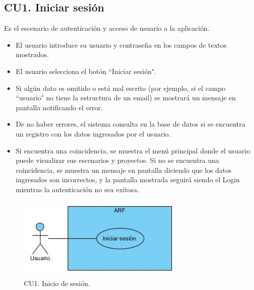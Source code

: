 \subsection{CU1. Iniciar sesión}\par
Es el escenario de autenticación y acceso de usuario a la aplicación. 
\begin{itemize}
	\item El usuario introduce su usuario y contraseña en los campos de textos mostrados.
	\item El usuario selecciona el botón ``Iniciar sesión".
	\item Si algún dato es omitido o está mal escrito (por ejemplo, si el campo ``usuario" no tiene la estructura de un email) se mostrará un mensaje en pantalla notificando el error.
	\item De no haber errores, el sistema consulta en la base de datos si se encuentra un registro con los datos ingresados por el usuario.
	\item Si encuentra una coincidencia, se muestra el menú principal donde el usuario puede visualizar sus escenarios y proyectos. Si no se encuentra una coincidencia, se muestra un mensaje en pantalla diciendo que los datos ingresados son incorrectos, y la pantalla mostrada seguirá siendo el Login mientras la autenticación no sea exitosa.
\end{itemize}

\begin{figure}[h!]
	\centering
	\includegraphics[width=8cm,height=4cm]{imagenes/analisis/cu/iniciar_sesion.jpg}
	\caption{CU1. Inicio de sesión.}
	\label{fig:iniciosesion}
\end{figure} 

